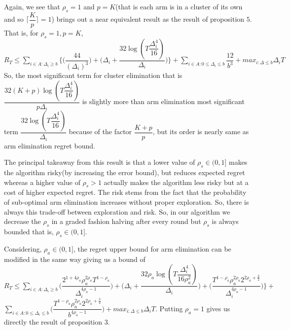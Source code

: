 \par Again, we see that $\rho_{s}=1$ and $p=K$(that is each arm is in a cluster of its own and so $\bigg\lceil \dfrac{K}{p} \bigg\rceil=1$) brings out a near equivalent result as the result of proposition $5$. That is, for $\rho_{s}=1,p=K$,
\newline $R_{T}\leq \sum_{i\in A:\Delta_{i}\geq b}\bigg \lbrace \bigg(\dfrac{44}{(\Delta_{i})^{3}}\bigg) + \bigg(\Delta_{i}+\dfrac{32\log{(T\dfrac{\Delta_{i}^{4}}{16})}}{\Delta_{i}}\bigg)\bigg\rbrace + \sum_{i\in A:0\leq\Delta_{i}\leq b}\dfrac{12}{b^{3}} + max_{i:\Delta\leq b}\Delta_{i}T$
\newline So, the most significant term for cluster elimination that is $\dfrac{32(K+p)\log{(T\dfrac{\Delta_{i}^{4}}{16})}}{p\Delta_{i}}$ is slightly more than arm elimination most significant term $\dfrac{32\log{(T\dfrac{\Delta_{i}^{4}}{16})}}{\Delta_{i}}$ because of the factor $\dfrac{K+p}{p}$, but its order is nearly same as arm elimination regret bound.
\par The principal takeaway from this result is that a lower value of $\rho_{s}\in (0,1]$ makes the algorithm risky(by increasing the error bound), but reduces expected regret whereas a higher value of $\rho_{s} > 1$ actually makes the algorithm less risky but at a cost of higher expected regret. The risk stems from the fact that the probability of sub-optimal arm elimination increases without proper exploration. So, there is always this trade-off between exploration and risk. So, in our algorithm we decrease the $\rho_{s}$ in a graded fashion halving after every round but $\rho_{s}$ is always bounded that is, $\rho_{s} \in (0,1]$. \

\begin{remark}
Considering, $\rho_{a}\in (0,1]$, the regret upper bound for arm elimination can be modified in the same way giving us a bound of
\newline
$R_{T}\leq \sum_{i\in A:\Delta_{i}\geq b}\bigg(\dfrac{2^{1+4\rho_{a}}\rho_{a}^{2\rho_{a}}T^{1-\rho_{a}}}{\Delta_{i}^{4\rho_{a}-1}}\bigg) + \bigg(\Delta_{i}+\dfrac{32\rho_{a}\log{(T\dfrac{\Delta_{i}^{4}}{16\rho_{a}^{2}})}}{\Delta_{i}}\bigg)  +  \bigg(\dfrac{T^{1-\rho_{a}}\rho_{a}^{2\rho_{a}}2^{2\rho_{a}+\frac{3}{2}}}{\Delta_{i}^{4\rho_{a} -1}} \bigg) \bigg \rbrace+$\newline$\sum_{i\in A:0\leq\Delta_{i}\leq b}\bigg(\dfrac{T^{1-\rho_{a}}\rho_{a}^{2\rho_{a}}2^{2\rho_{a}+\frac{3}{2}}}{b^{4\rho_{a} -1}} \bigg) + max_{i:\Delta\leq b}\Delta_{i}T$. 
\newline
Putting $\rho_{a}=1$ gives us directly the result of proposition $3$.
\end{remark}

